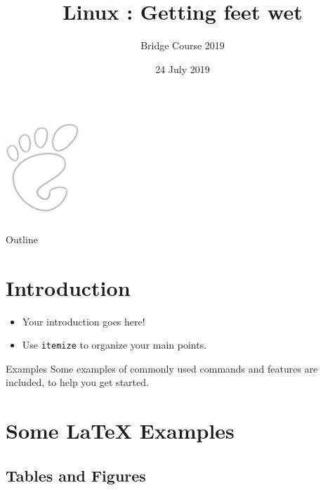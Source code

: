 \documentclass{beamer}
\title[Linux: Getting Feet wet]{Linux : Getting feet wet}
\author{Bridge Course 2019}
\institute{EE Dept IITB}
\date{24 July 2019}
\begin{document}
\begin{frame}
\begin{center}
\includegraphics[scale=0.5]{./gnome_logo.png}%
\end{center}
\titlepage
\end{frame}

\begin{frame}{Outline}
  \tableofcontents
\end{frame}

\section{Introduction}


\begin{frame}
\begin{itemize}
\item Your introduction goes here!
\item Use \texttt{itemize} to organize your main points.
\end{itemize}

\vskip 1cm

\begin{block}{Examples}
Some examples of commonly used commands and features are included, to help you get started.
\end{block}

\end{frame}

\section{Some \LaTeX{} Examples}

\subsection{Tables and Figures}
\end{document}
